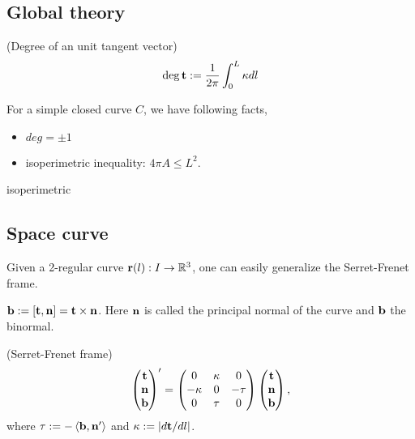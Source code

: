 \subsection{Global theory}
\begin{definition}
	(Degree of an unit tangent vector) \[\deg \mathbf{t} := \frac{1}{2\pi} \int_{0}^{L} \kappa dl\]
\end{definition}

For a simple closed curve $C$, we have following facts,
\begin{itemize}
	\item $deg = \pm 1$
	\item isoperimetric inequality: $4\pi A \leq L^2$. 
\end{itemize}

{isoperimetric}

\subsection{Space curve} Given a 2-regular curve $\mathbf{r}(l): I \rightarrow \mathbb{R}^3$, one can easily generalize the Serret-Frenet frame.
\begin{definition}
	$\mathbf{b} := [\mathbf{t}, \mathbf{n}] = \mathbf{t} \times \mathbf{n}$. Here $\mathbf{n}$ is called the principal normal of the curve and $\mathbf{b}$ the binormal.
\end{definition}

\begin{theorem}
	(Serret-Frenet frame)
	\begin{equation}
	\begin{pmatrix}
	\mathbf{t} \\
	\mathbf{n} \\
	\mathbf{b}
	\end{pmatrix}'
	=
	\begin{pmatrix}
	0       & \kappa & 0     \\
	-\kappa &    0   & -\tau \\
	0       &  \tau  & 0     \\
	\end{pmatrix}
	\begin{pmatrix}
	\mathbf{t} \\
	\mathbf{n} \\
	\mathbf{b}
	\end{pmatrix},
	\label{eq:frenet}
	\end{equation}
	where $\tau := -\left<  \mathbf{b} ,  \mathbf{n}'  \right>$ and $\kappa := |d\mathbf{t}/dl|$.
\end{theorem}

